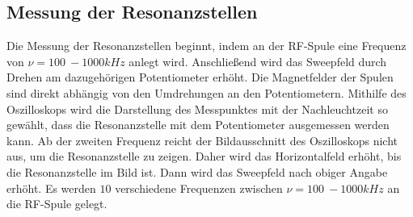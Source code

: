 \subsection{Messung der Resonanzstellen}
%
Die Messung der Resonanzstellen beginnt, indem an der RF-Spule eine Frequenz von $\nu=\SI{100}{}-{1000}{kHz}$ anlegt wird.
Anschließend wird das Sweepfeld durch Drehen am dazugehörigen Potentiometer erhöht.
Die Magnetfelder der Spulen sind direkt abhängig von den Umdrehungen an den Potentiometern.
Mithilfe des Oszilloskops wird die Darstellung des Messpunktes mit der Nachleuchtzeit so gewählt, dass die Resonanzstelle mit dem Potentiometer ausgemessen werden kann.
Ab der zweiten Frequenz reicht der Bildausschnitt des Oszilloskops nicht aus, um die Resonanzstelle zu zeigen.
Daher wird das Horizontalfeld erhöht, bis die Resonanzstelle im Bild ist.
Dann wird das Sweepfeld nach obiger Angabe erhöht.
Es werden $10$ verschiedene Frequenzen zwischen $\nu=\SI{100}{}-{1000}{kHz}$ an die RF-Spule gelegt.
%
